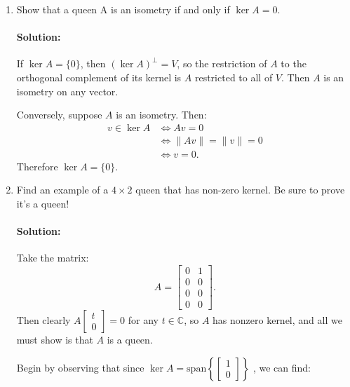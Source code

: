 \documentclass{article}
\begin{document}
\begin{enumerate}
\begin{enumerate}[label= (\alph*)]
\item Show that a queen A is an isometry if and only if $\ker A = {0}$.

    \paragraph{Solution: }If $\ker A=\{0\} $, then $(\ker A)^{\perp}=V$, so the restriction of $A$ to the orthogonal complement of its kernel is $A$ restricted to all of $V$. Then $A$ is an isometry on any vector.

    Conversely, suppose $A$ is an isometry. Then:
    \begin{align*}
        v\in \ker A&\iff Av=0\\
                   &\iff \|Av\|=\|v\|=0\\
                   &\iff v=0
    .\end{align*}
    Therefore $\ker A=\{0\} $. 

\item Find an example of a $4 \times  2$ queen that has non-zero kernel. Be sure to prove it's a queen!
    \paragraph{Solution: }Take the matrix:
    \[
        A=\begin{bmatrix} 0&1\\0&0\\ 0&0\\0&0  \end{bmatrix} 
    .\] 
    Then clearly $A\begin{bmatrix} t\\0 \end{bmatrix} =0$ for any $t\in \mathbb{C}$, so $A$ has nonzero kernel, and all we must show is that $A$ is a queen.

    Begin by observing that since $\ker A=\text{span} \left\{ \begin{bmatrix} 1\\0 \end{bmatrix}  \right\} $
    , we can find:


\end{enumerate}
\end{enumerate}
\end{document}
